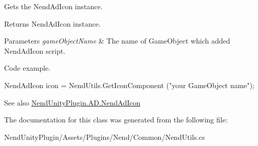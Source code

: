 Gets the Nend\+Ad\+Icon instance. 

\begin{DoxyReturn}{Returns}
Nend\+Ad\+Icon instance.
\end{DoxyReturn}

\begin{DoxyParams}{Parameters}
{\em game\+Object\+Name} & The name of Game\+Object which added Nend\+Ad\+Icon script.\\
\hline
\end{DoxyParams}


Code example. 
\begin{DoxyCode}
NendAdIcon icon = NendUtils.GetIconComponent (\textcolor{stringliteral}{"your GameObject name"});
\end{DoxyCode}
 

\begin{DoxySeeAlso}{See also}
\hyperlink{class_nend_unity_plugin_1_1_a_d_1_1_nend_ad_icon}{Nend\+Unity\+Plugin.\+A\+D.\+Nend\+Ad\+Icon}


\end{DoxySeeAlso}


The documentation for this class was generated from the following file\+:\begin{DoxyCompactItemize}
\item 
Nend\+Unity\+Plugin/\+Assets/\+Plugins/\+Nend/\+Common/Nend\+Utils.\+cs\end{DoxyCompactItemize}
